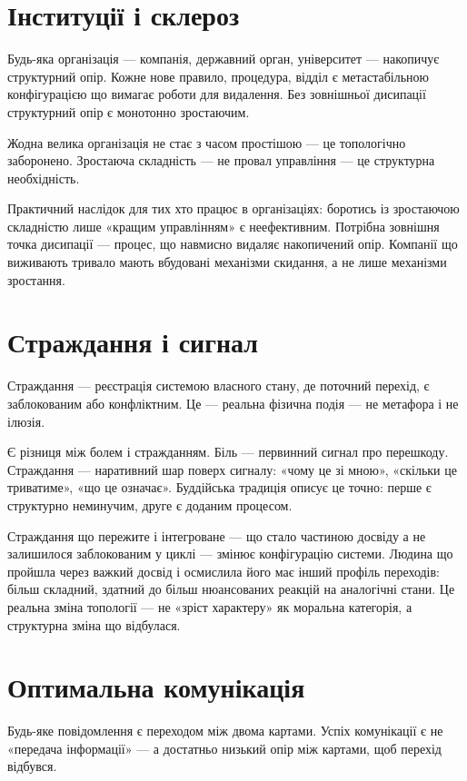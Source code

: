 \documentclass[12pt, a4paper, openany]{book}
\begin{document}
\section{Інституції і склероз}

Будь-яка організація --- компанія, державний орган, університет --- накопичує структурний опір. Кожне нове правило, процедура, відділ є метастабільною конфігурацією що вимагає роботи для видалення. Без зовнішньої дисипації структурний опір є монотонно зростаючим.

Жодна велика організація не стає з часом простішою --- це топологічно заборонено. Зростаюча складність — не провал управління --- це структурна необхідність.

Практичний наслідок для тих хто працює в організаціях: боротись із зростаючою складністю лише «кращим управлінням» є неефективним. Потрібна зовнішня точка дисипації --- процес, що навмисно видаляє накопичений опір. Компанії що виживають тривало мають вбудовані механізми скидання, а не лише механізми зростання.

\section{Страждання і сигнал}

Страждання — реєстрація системою власного стану, де поточний перехід, є заблокованим або конфліктним. Це — реальна фізична подія --- не метафора і не ілюзія.

Є різниця між болем і стражданням. Біль — первинний сигнал про перешкоду. Страждання — наративний шар поверх сигналу: «чому це зі мною», «скільки це триватиме», «що це означає». Буддійська традиція описує це точно: перше є структурно неминучим, друге є доданим процесом.

Страждання що пережите і інтегроване --- що стало частиною досвіду а не залишилося заблокованим у циклі --- змінює конфігурацію системи. Людина що пройшла через важкий досвід і осмислила його має інший профіль переходів: більш складний, здатний до більш нюансованих реакцій на аналогічні стани. Це реальна зміна топології --- не «зріст характеру» як моральна категорія, а структурна зміна що відбулася.

\section{Оптимальна комунікація}

Будь-яке повідомлення є переходом між двома картами. Успіх комунікації є не «передача інформації» --- а достатньо низький опір між картами, щоб перехід відбувся.
\end{document}
